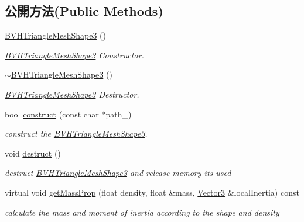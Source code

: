 \subsection*{公開方法(Public Methods)}
\begin{DoxyCompactItemize}
\item 
\hyperlink{class_magnum_1_1_b_v_h_triangle_mesh_shape3_a1043d44338ada951f5ec43eeddd00631}{B\+V\+H\+Triangle\+Mesh\+Shape3} ()
\begin{DoxyCompactList}\small\item\em \hyperlink{class_magnum_1_1_b_v_h_triangle_mesh_shape3}{B\+V\+H\+Triangle\+Mesh\+Shape3} Constructor. \end{DoxyCompactList}\item 
\hyperlink{class_magnum_1_1_b_v_h_triangle_mesh_shape3_a3399a419d84e28c1ce6f75d30c9fd256}{$\sim$\+B\+V\+H\+Triangle\+Mesh\+Shape3} ()
\begin{DoxyCompactList}\small\item\em \hyperlink{class_magnum_1_1_b_v_h_triangle_mesh_shape3}{B\+V\+H\+Triangle\+Mesh\+Shape3} Destructor. \end{DoxyCompactList}\item 
bool \hyperlink{class_magnum_1_1_b_v_h_triangle_mesh_shape3_aad17f2c23b7601f7b9443b9a40a73595}{construct} (const char $\ast$path\+\_\+)
\begin{DoxyCompactList}\small\item\em construct the \hyperlink{class_magnum_1_1_b_v_h_triangle_mesh_shape3}{B\+V\+H\+Triangle\+Mesh\+Shape3}. \end{DoxyCompactList}\item 
void \hyperlink{class_magnum_1_1_b_v_h_triangle_mesh_shape3_a8a810bc16558b9a6bdd1d506122a8db6}{destruct} ()\hypertarget{class_magnum_1_1_b_v_h_triangle_mesh_shape3_a8a810bc16558b9a6bdd1d506122a8db6}{}\label{class_magnum_1_1_b_v_h_triangle_mesh_shape3_a8a810bc16558b9a6bdd1d506122a8db6}

\begin{DoxyCompactList}\small\item\em destruct \hyperlink{class_magnum_1_1_b_v_h_triangle_mesh_shape3}{B\+V\+H\+Triangle\+Mesh\+Shape3} and release memory its used \end{DoxyCompactList}\item 
virtual void \hyperlink{class_magnum_1_1_b_v_h_triangle_mesh_shape3_af1c3589b58094e8a79e5b3fe00b4b101}{get\+Mass\+Prop} (float density, float \&mass, \hyperlink{class_magnum_1_1_vector3}{Vector3} \&local\+Inertia) const 
\begin{DoxyCompactList}\small\item\em calculate the mass and moment of inertia according to the shape and density \end{DoxyCompactList}\end{DoxyCompactItemize}


